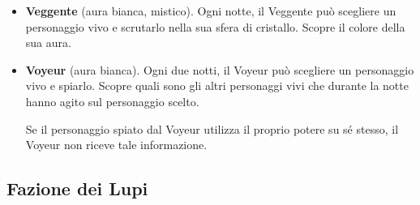 \documentclass[a4paper,10pt]{article}
\begin{document}
\begin{itemize}
 \item {\bf Veggente} (aura bianca, mistico). Ogni notte, il Veggente può
scegliere un personaggio vivo e scrutarlo nella sua sfera di cristallo. Scopre
il colore della sua aura.

 \item {\bf Voyeur} (aura bianca). Ogni due notti, il Voyeur può scegliere un
personaggio vivo e spiarlo. Scopre quali sono gli altri personaggi vivi che
durante la notte hanno agito sul personaggio scelto.
 
 Se il personaggio spiato dal Voyeur utilizza il proprio potere su sé stesso, il
Voyeur non riceve tale informazione.

\end{itemize}


\subsection*{Fazione dei Lupi}
\end{document}
